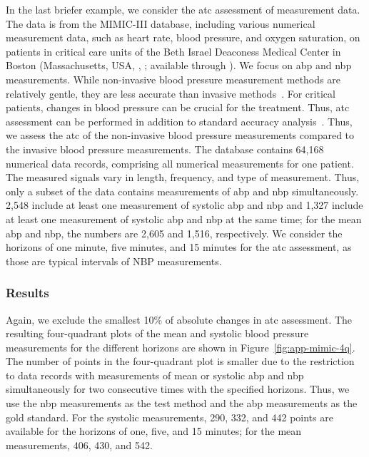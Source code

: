 \documentclass[pdflatex]{sn-jnl}
\theoremstyle{plain}%
\theoremstyle{definition}
\begin{document}
In the last briefer example, we consider the \ac{atc} assessment of measurement data.
The data is from the MIMIC-III database, including various numerical measurement data, such as heart rate, blood pressure, and oxygen saturation, on patients in critical care units of the Beth Israel Deaconess Medical Center in Boston (Massachusetts, USA, \cite{Johnson2016}, \citealp{Moody2017}; available through \citealp{Goldberger2000}).
We focus on \acf{abp} and \acf{nbp} measurements.
While non-invasive blood pressure measurement methods are relatively gentle, they are less accurate than invasive methods~\citet[see][]{Saugel2014}.
For critical patients, changes in blood pressure can be crucial for the treatment.
Thus, \ac{atc} assessment can be performed in addition to standard accuracy analysis~\citep[see, for example, ][]{Mostafa2020}.
Thus, we assess the \ac{atc} of the non-invasive blood pressure measurements compared to the invasive blood pressure measurements.
The database contains 64,168 numerical data records, comprising all numerical measurements for one patient.
The measured signals vary in length, frequency, and type of measurement.
Thus, only a subset of the data contains measurements of \ac{abp} and \ac{nbp} simultaneously.
2,548 include at least one measurement of systolic \ac{abp} and \ac{nbp} and 1,327 include at least one measurement of systolic \ac{abp} and \ac{nbp} at the same time; for the mean \ac{abp} and \ac{nbp}, the numbers are 2,605 and 1,516, respectively.
We consider the horizons of one minute, five minutes, and 15 minutes for the \ac{atc} assessment, as those are typical intervals of NBP measurements.

\subsubsection*{Results}

Again, we exclude the smallest 10\% of absolute changes in \ac{atc} assessment.
The resulting four-quadrant plots of the mean and systolic blood pressure measurements for the different horizons are shown in Figure~\ref{fig:app-mimic-4q}.
The number of points in the four-quadrant plot is smaller due to the restriction to data records with measurements of mean or systolic \ac{abp} and \ac{nbp} simultaneously for two consecutive times with the specified horizons.
Thus, we use the \ac{nbp} measurements as the test method and the \ac{abp} measurements as the gold standard.
For the systolic measurements, 290, 332, and 442 points are available for the horizons of one, five, and 15 minutes; for the mean measurements, 406, 430, and 542.
\end{document}
